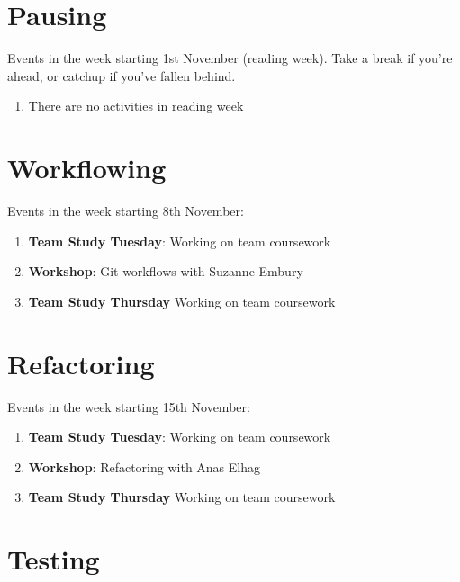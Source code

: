 \documentclass[
]{book}
\providecommand{\tightlist}{%
  \setlength{\itemsep}{0pt}\setlength{\parskip}{0pt}}
\begin{document}
\hypertarget{week6}{%
\section{Pausing}\label{week6}}

Events in the week starting 1st November (reading week). Take a break if you're ahead, or catchup if you've fallen behind.

\begin{enumerate}
\def\labelenumi{\arabic{enumi}.}
\tightlist
\item
  There are no activities in reading week
\end{enumerate}

\hypertarget{week7}{%
\section{Workflowing}\label{week7}}

Events in the week starting 8th November:

\begin{enumerate}
\def\labelenumi{\arabic{enumi}.}
\tightlist
\item
  \textbf{Team Study Tuesday}: Working on team coursework
\item
  \textbf{Workshop}: Git workflows with Suzanne Embury
\item
  \textbf{Team Study Thursday} Working on team coursework
\end{enumerate}

\hypertarget{week8}{%
\section{Refactoring}\label{week8}}

Events in the week starting 15th November:

\begin{enumerate}
\def\labelenumi{\arabic{enumi}.}
\tightlist
\item
  \textbf{Team Study Tuesday}: Working on team coursework
\item
  \textbf{Workshop}: Refactoring with Anas Elhag
\item
  \textbf{Team Study Thursday} Working on team coursework
\end{enumerate}

\hypertarget{week9}{%
\section{Testing}\label{week9}}
\end{document}
